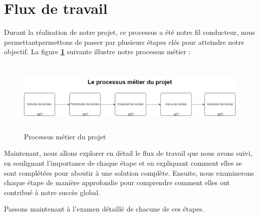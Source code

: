   \section{Flux de travail}
  \par Durant la réalisation de notre projet, ce processus a été notre fil conducteur, nous permettantpermettons de passer par plusieurs étapes clés pour atteindre notre objectif. 
La figure \textbf{\ref{fig:BPMN}} suivante illustre notre processus métier :
        \begin{figure}[H]
        \centering
        \includegraphics[width=1\linewidth, height=3.5cm]{img/conception/BPMN.png}
        \caption{Processus métier du projet}
        \label{fig:BPMN}
        \end{figure}
  \par Maintenant, nous allons explorer en détail le flux de travail que nous avons suivi, en soulignant l'importance de chaque étape et en expliquant comment elles se sont complétées pour aboutir à une solution complète. 
  Ensuite, nous examinerons chaque étape de manière approfondie pour comprendre comment elles ont contribué à notre succès global.
  \par Passons maintenant à l'examen détaillé de chacune de ces étapes.

